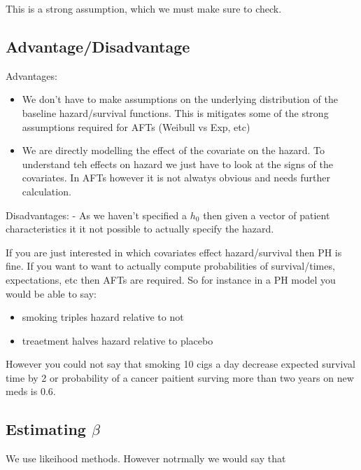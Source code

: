 \documentclass[
  letterpaper,
  DIV=11,
  numbers=noendperiod]{scrreprt}
\providecommand{\tightlist}{%
  \setlength{\itemsep}{0pt}\setlength{\parskip}{0pt}}\usepackage{longtable,booktabs,array}
\begin{document}
This is a strong assumption, which we must make sure to check.

\hypertarget{advantagedisadvantage}{%
\subsection{Advantage/Disadvantage}\label{advantagedisadvantage}}

Advantages:

\begin{itemize}
\tightlist
\item
  We don't have to make assumptions on the underlying distribution of
  the baseline hazard/survival functions. This is mitigates some of the
  strong assumptions required for AFTs (Weibull vs Exp, etc)
\item
  We are directly modelling the effect of the covariate on the hazard.
  To understand teh effects on hazard we just have to look at the signs
  of the covariates. In AFTs however it is not alwatys obvious and needs
  further calculation.
\end{itemize}

Disadvantages: - As we haven't specified a \(h_0\) then given a vector
of patient characteristics it it not possible to actually specify the
hazard.

If you are just interested in which covariates effect hazard/survival
then PH is fine. If you want to want to actually compute probabilities
of survival/times, expectations, etc then AFTs are required. So for
instance in a PH model you would be able to say:

\begin{itemize}
\tightlist
\item
  smoking triples hazard relative to not
\item
  treaetment halves hazard relative to placebo
\end{itemize}

However you could not say that smoking 10 cigs a day decrease expected
survival time by 2 or probability of a cancer paitient surving more than
two years on new meds is 0.6.

\hypertarget{estimating-beta}{%
\subsection{\texorpdfstring{Estimating
\(\beta\)}{Estimating \textbackslash beta}}\label{estimating-beta}}

We use likeihood methods. However notrmally we would say that
\end{document}
